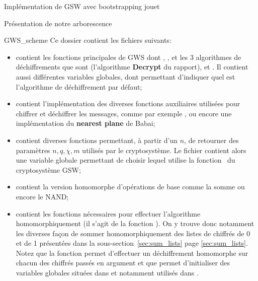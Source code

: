 \begin{section}{Implémentation de GSW avec bootstrapping \og{}jouet\fg~{}}
\begin{subsection}{Présentation de notre arborescence}
\begin{subsubsection}{GWS\_scheme}
Ce dossier contient les fichiers suivants:
\begin{itemize}
\item {} contient les fonctions principales de GWS dont , ,  et les 3
algorithmes de déchiffrements que sont  (l'algorithme \textbf{Decrypt} du rapport), 
et . Il contient aussi différentes variables globales, dont  permettant d'indiquer
quel est l'algorithme de déchiffrement par défaut;
\item {} contient l'implémentation des diverses fonctions auxiliaires utilisées pour
chiffrer et déchiffrer les messages, comme par exemple , ou encore une implémentation du \textbf{nearest plane} de
Babai;
\item {} contient diverses fonctions permettant, à partir d'un $n$, de retourner des paramètres
$n, q, \chi, m$ utilisés par le cryptosystème. Le fichier  contient alors une variable globale
 permettant de choisir lequel utilise la fonction  du cryptosystème GSW; 
\item {} contient la version homomorphe
	d'opérations de base comme la somme ou encore le NAND;
\item {} contient les fonctions nécessaires pour
	effectuer l'algorithme  homomorphiquement (il s'agit de la fonction ).
	On y trouve donc notamment les diverses façon de sommer homomorphiquement des listes de chiffrés de 0 et de
	1 présentées dans la sous-section~\ref{sec:sum_lists} page \ref{sec:sum_lists}. Notez que la fonction
	 permet d'effectuer un déchiffrement homomorphe sur chacun des chiffrés passés
	en argument et que  permet d'initialiser des variables globales  situées dans  et notamment utilisés dans
	. 
	\end{itemize}
\end{subsubsection} %


\end{subsection}
\end{section}
